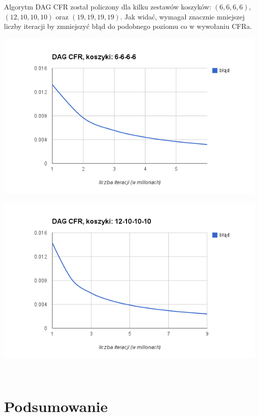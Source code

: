 \documentclass[licencjacka]{pracamgr}
\begin{document}
\noindent
Algorytm DAG CFR został policzony dla kilku zestawów koszyków: $(6,6,6,6)$, $(12,10,10,10)$ oraz $(19,19,19,19)$.
Jak widać, wymagał znacznie mniejszej liczby iteracji by zmniejszyć błąd do podobnego poziomu co w wywołaniu CFRa.

\includegraphics[scale=0.7]{wykres-dag-6.png}

\includegraphics[scale=0.7]{wykres-dag-12.png}


$\,$ \\

\chapter{Podsumowanie}

 
 
\end{document}
